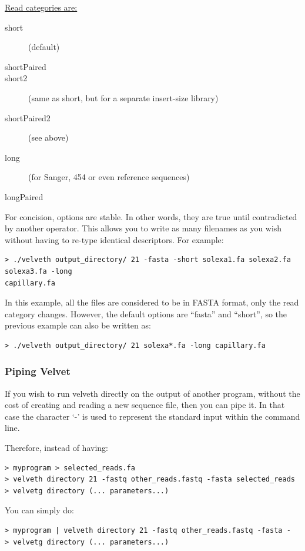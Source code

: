 \documentclass{article}
\begin{document}
\underline{Read categories are:}
\begin{description}
\item[short] (default)
\item[shortPaired]
\item[short2] (same as short, but for a separate insert-size library)
\item[shortPaired2] (see above) 
\item[long] (for Sanger, 454 or even reference sequences)
\item[longPaired]
\end{description}

For concision, options are stable. In other words, they are true until
contradicted by another operator. This allows you to write as many filenames
as you wish without having to re-type identical descriptors.  For example:
\begin{verbatim}
> ./velveth output_directory/ 21 -fasta -short solexa1.fa solexa2.fa solexa3.fa -long
capillary.fa
\end{verbatim}

In this example, all the files are considered to be in FASTA format,
only the read category changes. However, the default options are ``fasta'' and ``short'', so the previous example
can also be written as:

\begin{verbatim}
> ./velveth output_directory/ 21 solexa*.fa -long capillary.fa
\end{verbatim}

\subsubsection{Piping Velvet}

If you wish to run velveth directly on the output of another program, without the cost of creating and reading a new sequence file, then you can pipe it. In that case the character `-' is used to represent the standard input within the command line. 

Therefore, instead of having:

\begin{verbatim}
> myprogram > selected_reads.fa
> velveth directory 21 -fastq other_reads.fastq -fasta selected_reads
> velvetg directory (... parameters...) 
\end{verbatim}

You can simply do:

\begin{verbatim}
> myprogram | velveth directory 21 -fastq other_reads.fastq -fasta -
> velvetg directory (... parameters...) 
\end{verbatim}
\end{document}
